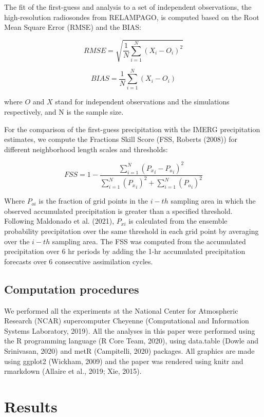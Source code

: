 \documentclass[final,5p,times,twocolumn,authoryear]{elsarticle} %
\begin{document}
The fit of the first-guess and analysis to a set of independent observations, the high-resolution radiosondes from RELAMPAGO, is computed based on the Root Mean Square Error (RMSE) and the BIAS:

\[\mathit{RMSE} = \sqrt{\frac{1}{N}\sum_{i = 1}^{N} (X_i - O_i)^{2}}\]

\[\mathit{BIAS} = \frac{1}{N}\sum_{i = 1}^{N} (X_i - O_i)\]

where \(O\) and \(X\) stand for independent observations and the simulations respectively, and N is the sample size.

For the comparison of the first-guess precipitation with the IMERG precipitation estimates, we compute the Fractions Skill Score (FSS, Roberts (2008)) for different neighborhood length scales and thresholds:

\[\mathit{FSS} = 1-\frac{\sum_{i=1}^{N} ({P_x}_i-{P_o}_i)^{2}}{\sum_{i=1}^{N} ({P_x}_i)^{2}+\sum_{i=1}^{N} ({P_o}_i)^{2}} \]

Where \(P_{oi}\) is the fraction of grid points in the \(i-th\) sampling area in which the observed accumulated precipitation is greater than a specified threshold. Following Maldonado et al. (2021), \(P_{xi}\) is calculated from the ensemble probability precipitation over the same threshold in each grid point by averaging over the \(i-th\) sampling area.
The FSS was computed from the accumulated precipitation over 6 hr periods by adding the 1-hr accumulated precipitation forecasts over 6 consecutive assimilation cycles.

\hypertarget{computation-procedures}{%
\subsection{Computation procedures}\label{computation-procedures}}

We performed all the experiments at the National Center for Atmospheric Research (NCAR) supercomputer Cheyenne (Computational and Information Systems Laboratory, 2019). All the analyses in this paper were performed using the R programming language (R Core Team, 2020), using data.table (Dowle and Srinivasan, 2020) and metR (Campitelli, 2020) packages.
All graphics are made using ggplot2 (Wickham, 2009) and the paper was rendered using knitr and rmarkdown (Allaire et al., 2019; Xie, 2015).

\hypertarget{results}{%
\section{Results}\label{results}}
\end{document}
